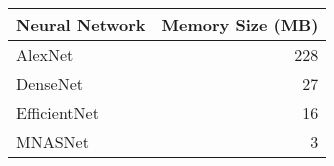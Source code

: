 \begin{tabular}{lr}
\toprule
Neural Network & Memory Size (MB) \\
\midrule
AlexNet & 228 \\
DenseNet & 27 \\
EfficientNet & 16 \\
MNASNet & 3 \\
\bottomrule
\end{tabular}
